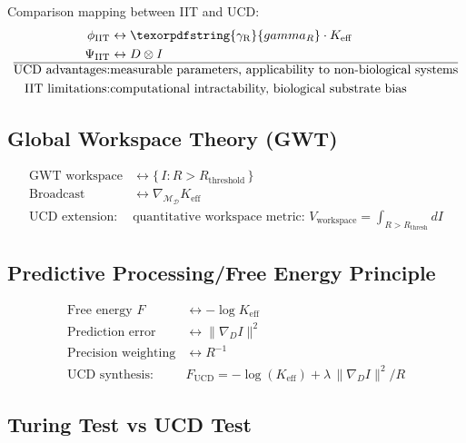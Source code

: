 \documentclass[12pt,a4paper]{article}
\DeclareRobustCommand{\gaR}{\texorpdfstring{\ensuremath{\gamma_{\mathrm{R}}}}{gamma_R}}
\newcommand{\eff}{\mathrm{eff}}
\newcommand{\Dict}{\mathcal{D}}
\newcommand{\Mdict}{\mathcal{M}_{\Dict}}
\newcommand{\Ke}{K_{\eff}}
\begin{document}
	Comparison mapping between IIT and UCD:
	\[
	\begin{aligned}
		\phi_{\mathrm{IIT}} &\leftrightarrow \gaR \cdot \Ke \\
		\Psi_{\mathrm{IIT}} &\leftrightarrow D \otimes I \\
		\hline
		\text{UCD advantages:} & \text{measurable parameters, applicability to non-biological systems} \\
		\text{IIT limitations:} & \text{computational intractability, biological substrate bias}
	\end{aligned}
	\]
	
	\subsection{Global Workspace Theory (GWT)}
	
	\[
	\begin{aligned}
		\text{GWT workspace} &\leftrightarrow \{\,I : R > R_{\mathrm{threshold}}\,\} \\
		\text{Broadcast} &\leftrightarrow \nabla_{\Mdict} \Ke \\
		\hline
		\text{UCD extension:} & \text{quantitative workspace metric: } V_{\mathrm{workspace}} = \int_{R>R_{\mathrm{thresh}}} dI
	\end{aligned}
	\]
	
	\subsection{Predictive Processing/Free Energy Principle}
	
	\[
	\begin{aligned}
		\text{Free energy } F &\leftrightarrow -\log \Ke \\
		\text{Prediction error} &\leftrightarrow \|\nabla_D I\|^2 \\
		\text{Precision weighting} &\leftrightarrow R^{-1} \\
		\hline
		\text{UCD synthesis:} & F_{\mathrm{UCD}} = -\log(\Ke) + \lambda\, \|\nabla_D I\|^2 / R
	\end{aligned}
	\]
	
	\subsection{Turing Test vs UCD Test}
	
\end{document}
